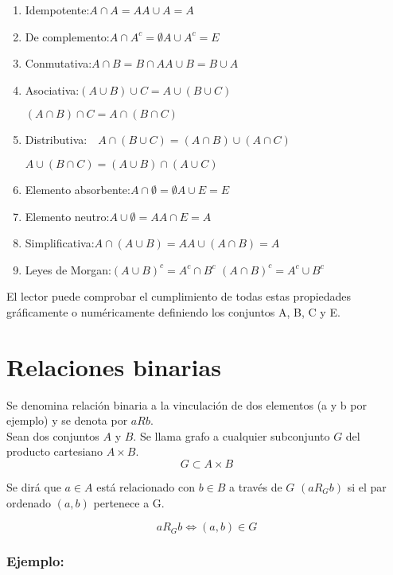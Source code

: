 \documentclass[0_algebra.tex]{subfiles}
\begin{document}
\begin{enumerate}
\item Idempotente:\quad $A\cap A=A$\quad  $A\cup A=A$
\item De complemento:\quad $A\cap A^c=\emptyset$\quad  $A\cup A^c=E$
\item Conmutativa:\quad $A\cap B=B\cap A$\quad  $A\cup B=B\cup A$
\item Asociativa:\quad $(A\cup B)\cup C=A\cup (B\cup C)$

\hspace{3.14 cm}  $(A\cap B)\cap C=A\cap (B\cap C)$
\item Distributiva:\ \ $A\cap (B\cup C)=(A\cap B)\cup (A\cap C)$

\hspace{2.4 cm} $A\cup (B\cap C)=(A\cup B)\cap (A\cup C)$
\item Elemento absorbente:\quad $A\cap \emptyset=\emptyset$\quad  $A\cup E=E$
\item Elemento neutro:\quad $A\cup \emptyset=A$\quad  $A\cap E=A$
\item Simplificativa:\quad $A\cap(A\cup B)=A$\quad  $A\cup(A\cap B)=A$
\item Leyes de Morgan:\quad  $(A\cup B)^c=A^c \cap B^c$ \quad  $(A\cap B)^c=A^c\cup B^c$\\
\end{enumerate}

El lector puede comprobar el cumplimiento de todas estas propiedades gráficamente o numéricamente definiendo los conjuntos A, B, C y E.
\newpage
\section{Relaciones binarias}

Se denomina relación binaria a la vinculación de dos elementos (a y b por ejemplo) y se denota por $aRb$.\\

Sean dos conjuntos $A$ y $B$. Se llama grafo a cualquier subconjunto $G$ del producto cartesiano $A\times B$.
$$
G \subset A\times B
$$

Se dirá que $a\in A$ está relacionado con $b\in B$ a través de $G$ $(aR_Gb)$ si el par ordenado $(a,b)$ pertenece a G.

$$
aR_Gb \Leftrightarrow (a,b) \in G
$$

\subsubsection*{Ejemplo:}
\end{document}
